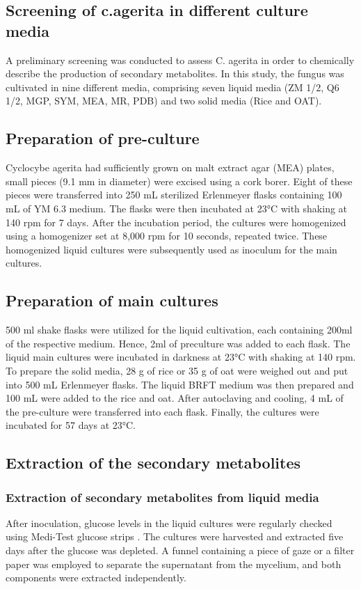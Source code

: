 \subsection{Screening of c.agerita in different culture media}
A preliminary screening was conducted to assess C. agerita in order to chemically describe the production of secondary metabolites. In this study, the fungus was cultivated in nine different media, comprising seven liquid media (ZM 1/2, Q6 1/2, MGP, SYM, MEA, MR, PDB) and two solid media (Rice and OAT).

\subsection{Preparation of pre-culture}
Cyclocybe agerita had sufficiently grown on malt extract agar (MEA) plates, small pieces (9.1 mm in diameter) were excised using a cork borer. Eight of these pieces were transferred into 250 mL sterilized Erlenmeyer flasks containing 100 mL of YM 6.3 medium. The flasks were then incubated at 23°C with shaking at 140 rpm for 7 days. After the incubation period, the cultures were homogenized using a homogenizer set at 8,000 rpm for 10 seconds, repeated twice. These homogenized liquid cultures were subsequently used as inoculum for the main cultures.

\subsection{Preparation of main cultures}
500 ml shake flasks were utilized for the liquid cultivation, each containing 200ml of the respective medium. Hence, 2ml of preculture was added to each flask. The liquid main cultures were incubated in darkness at 23°C with shaking at 140 rpm.\\

To prepare the solid media, 28 g of rice or 35 g of oat were weighed out and put into 500 mL Erlenmeyer flasks. The liquid BRFT medium was then prepared and 100 mL were added to the rice and oat. After autoclaving and cooling, 4 mL of the pre-culture were transferred into each flask. Finally, the cultures were incubated for 57 days at 23°C.


\subsection{Extraction of the secondary metabolites}

\subsubsection{Extraction of secondary metabolites from liquid media} \label{ extraction-liquid-media}
After inoculation, glucose levels in the liquid cultures were regularly checked using Medi-Test glucose strips \cite{Rita2023}. The cultures were harvested and extracted five days after the glucose was depleted. A funnel containing a piece of gaze or a filter paper  was employed to separate the supernatant from the mycelium, and both components were extracted independently.\\


